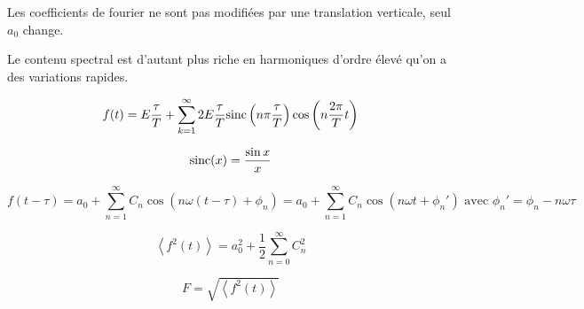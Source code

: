 \begin{prop} Les coefficients de fourier ne sont pas modifiées par une translation verticale, seul $a_0$ change.
\end{prop}

\begin{rem} Le contenu spectral est d'autant plus riche en harmoniques d'ordre élevé qu'on a des variations rapides.
\end{rem}

\begin{lemme}\[
    f(t) = E\frac{\tau}{T} + \sum_{k=1}^{\infty} 2E\frac{\tau}{T}\text{sinc}\left(n\pi\frac{\tau}{T}\right)\cos\left(n\frac{2\pi}{T}t\right)
\]\end{lemme}

\begin{defi}\[
    \text{sinc}(x) = \frac{\sin x}{x}
\]\end{defi}

\begin{prop}\[
    f(t-\tau) = a_0 + \sum_{n=1}^\infty C_n\cos(n\omega(t-\tau) + \phi_n) = a_0 + \sum_{n=1}^\infty C_n\cos(n\omega t + \phi_n') \text{ avec } \phi_n' = \phi_n - n\omega\tau
\]\end{prop}

\begin{theo}\[
    \left<f^2(t)\right> = a_0^2 + \frac{1}{2}\sum_{n=0}^\infty C_n^2
\]\end{theo}

\begin{defi}\[
    F = \sqrt{\left<f^2(t)\right>}
\]\end{defi}


